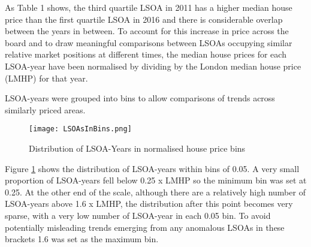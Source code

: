 \documentclass{article}
\begin{document}
As Table 1 shows, the third quartile LSOA in 2011 has a higher median house price than the first quartile LSOA in 2016 and there is considerable overlap between the years in between. To account for this increase in price across the board and to draw meaningful comparisons between LSOAs occupying similar relative market positions at different times, the median house prices for each LSOA-year have been normalised by dividing by the London median house price (LMHP) for that year. 
\newline

LSOA-years were grouped into bins to allow comparisons of trends across similarly priced areas. 

\begin{figure}[H]
  \texttt{[image: LSOAsInBins.png]}
  \caption{Distribution of LSOA-Years in normalised house price bins}
  \label{fig:LSOAsInBins}
\end{figure}


Figure \ref{fig:LSOAsInBins} shows the distribution of LSOA-years within bins of 0.05. A very small proportion of LSOA-years fell below 0.25 x LMHP so the minimum bin was set at 0.25. At the other end of the scale, although there are a relatively high number of LSOA-years above 1.6 x LMHP, the distribution after this point becomes very sparse, with a very low number of LSOA-year in each 0.05 bin. To avoid potentially misleading trends emerging from any anomalous LSOAs in these brackets 1.6 was set as the maximum bin.
\end{document}
